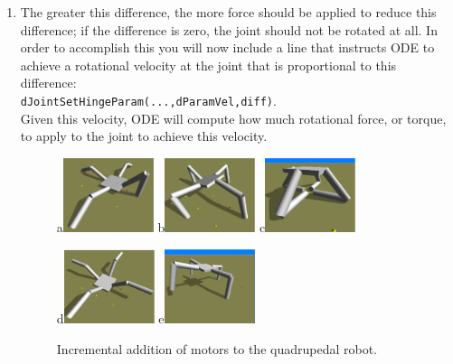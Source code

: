\documentclass[12pt]{article}
\begin{document}
\begin{enumerate}
\item The greater this difference, the more force should be applied to reduce this difference; if the difference is zero, the joint should not be rotated at all. In order to accomplish this you will now include a line that instructs ODE to achieve a rotational velocity at the joint that is proportional to this difference: \\
    \texttt{dJointSetHingeParam(...,dParamVel,diff)}. \\
    Given this velocity, ODE will compute how much rotational force, or torque, to apply to the joint to achieve this velocity.

\begin{figure}[!t]
\centerline{
a\includegraphics[width=0.25\textwidth]{Fig1a.eps}
b\includegraphics[width=0.25\textwidth]{Fig1b.eps}
c\includegraphics[width=0.25\textwidth]{Fig1c.eps}}
\centerline{
d\includegraphics[width=0.25\textwidth]{Fig1d.eps}
e\includegraphics[width=0.25\textwidth]{Fig1e.eps}}
\caption{Incremental addition of motors to the quadrupedal robot.}
\label{Fig1}
\end{figure}


\end{enumerate}
\end{document}
